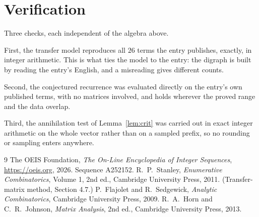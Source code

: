 \documentclass[11pt,a4paper]{article}
\theoremstyle{plain}
\theoremstyle{definition}
\begin{document}
\section{Verification}

Three checks, each independent of the algebra above.

First, the transfer model reproduces all $26$ terms the entry publishes, exactly, in
integer arithmetic. This is what ties the model to the entry: the digraph is built by reading
the entry's English, and a misreading gives different counts.

Second, the conjectured recurrence was evaluated directly on the entry's own published terms,
with no matrices involved, and holds wherever the proved range and the data overlap.

Third, the annihilation test of Lemma~\ref{lem:crit} was carried out in exact integer
arithmetic on the whole vector rather than on a sampled prefix, so no rounding or sampling
enters anywhere.

\begin{thebibliography}{9}
 The OEIS Foundation, \emph{The On-Line Encyclopedia of Integer
Sequences}, \url{https://oeis.org}, 2026. Sequence A252152.
 R.~P.~Stanley, \emph{Enumerative Combinatorics}, Volume 1, 2nd ed.,
Cambridge University Press, 2011. (Transfer-matrix method, Section 4.7.)
 P.~Flajolet and R.~Sedgewick, \emph{Analytic Combinatorics}, Cambridge
University Press, 2009.
 R.~A.~Horn and C.~R.~Johnson, \emph{Matrix Analysis}, 2nd ed., Cambridge
University Press, 2013.
\end{thebibliography}
\end{document}
